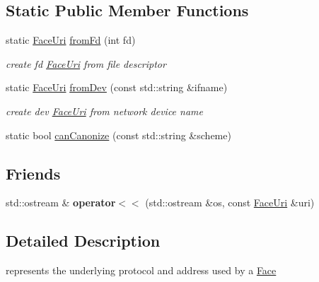 \subsection*{Static Public Member Functions}
\begin{DoxyCompactItemize}
\item 
static \hyperlink{classndn_1_1util_1_1FaceUri}{Face\+Uri} \hyperlink{classndn_1_1util_1_1FaceUri_a750a90ef70152e3b32ea03a7ac9c1bc3}{from\+Fd} (int fd)\hypertarget{classndn_1_1util_1_1FaceUri_a750a90ef70152e3b32ea03a7ac9c1bc3}{}\label{classndn_1_1util_1_1FaceUri_a750a90ef70152e3b32ea03a7ac9c1bc3}

\begin{DoxyCompactList}\small\item\em create fd \hyperlink{classndn_1_1util_1_1FaceUri}{Face\+Uri} from file descriptor \end{DoxyCompactList}\item 
static \hyperlink{classndn_1_1util_1_1FaceUri}{Face\+Uri} \hyperlink{classndn_1_1util_1_1FaceUri_ae74926798015e6111da8edd44b2fbe04}{from\+Dev} (const std\+::string \&ifname)\hypertarget{classndn_1_1util_1_1FaceUri_ae74926798015e6111da8edd44b2fbe04}{}\label{classndn_1_1util_1_1FaceUri_ae74926798015e6111da8edd44b2fbe04}

\begin{DoxyCompactList}\small\item\em create dev \hyperlink{classndn_1_1util_1_1FaceUri}{Face\+Uri} from network device name \end{DoxyCompactList}\item 
static bool \hyperlink{classndn_1_1util_1_1FaceUri_ad5c612dd772c382faf0a8fde66420431}{can\+Canonize} (const std\+::string \&scheme)
\end{DoxyCompactItemize}
\subsection*{Friends}
\begin{DoxyCompactItemize}
\item 
std\+::ostream \& {\bfseries operator$<$$<$} (std\+::ostream \&os, const \hyperlink{classndn_1_1util_1_1FaceUri}{Face\+Uri} \&uri)\hypertarget{classndn_1_1util_1_1FaceUri_a5efe548cc0ad9f3d7a57abb2811e3eaa}{}\label{classndn_1_1util_1_1FaceUri_a5efe548cc0ad9f3d7a57abb2811e3eaa}

\end{DoxyCompactItemize}


\subsection{Detailed Description}
represents the underlying protocol and address used by a \hyperlink{classndn_1_1Face}{Face} 

